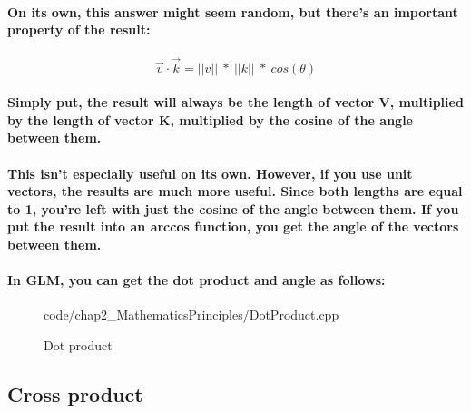 \paragraph{
    On its own, this answer might seem random, but there's an important property of the result:
}

\paragraph{
    \begin{equation*}
    \vec{v} \cdotp \vec{k} =||v||\ *\ ||k||\ *\ cos( \theta )
    \end{equation*}
}

\paragraph{
    Simply put, the result will always be the length of vector V, multiplied by the length of vector K, multiplied by the cosine of the angle between them.
}

\paragraph{
    This isn't especially useful on its own. However, if you use unit vectors, the results are much more useful. Since both lengths are equal to 1, you're left with just the cosine of the angle between them. If you put the result into an arccos function, you get the angle of the vectors between them.
}

\paragraph{
    In GLM, you can get the dot product and angle as follows:
}

\begin{frame}{}
    \begin{figure}[ht]
    \centering
    \colorbox{backgroundcolor}{
        \parbox{0.9\textwidth}{
            
            {code/chap2_MathematicsPrinciples/DotProduct.cpp}
        }
    }
    \caption{Dot product}
    \label{fig:dot_product}
    \end{figure}
\end{frame}

\subsection{\textsf{Cross product}}
